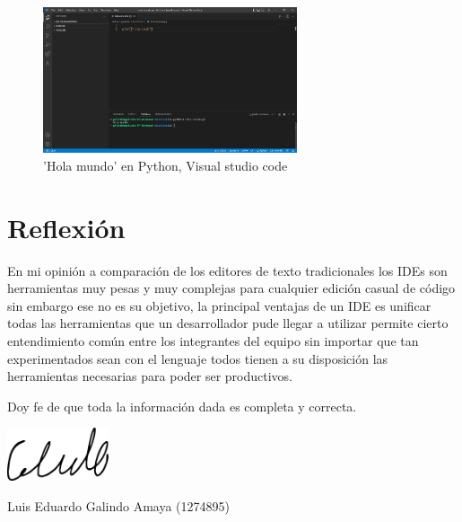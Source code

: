 \documentclass[12pt]{article}
\begin{document}
\begin{figure}[htbp]
\centering
\includegraphics[width=7.5cm]{./img/visual-studio.png}
\caption{'Hola mundo' en Python, Visual studio code}
\end{figure}

\pagebreak

\section*{Reflexión}
\label{sec:org417f437}
\begin{mdframed}
En mi opinión a comparación de los editores de texto tradicionales los IDEs son herramientas muy pesas y muy complejas para cualquier edición casual de código sin embargo ese no es su objetivo, la principal ventajas de un IDE es unificar todas las herramientas que un desarrollador pude llegar a utilizar permite cierto entendimiento común entre los integrantes del equipo sin importar que tan experimentados sean con el lenguaje todos tienen a su disposición las herramientas necesarias para poder ser productivos.
\end{mdframed}

\begin{center}
Doy fe de que toda la información dada es  completa y correcta. \\
\begin{center}
\includegraphics[width=3cm]{../includes/firma.png}
\end{center}
Luis Eduardo Galindo Amaya (1274895)
\end{center}
\end{document}
